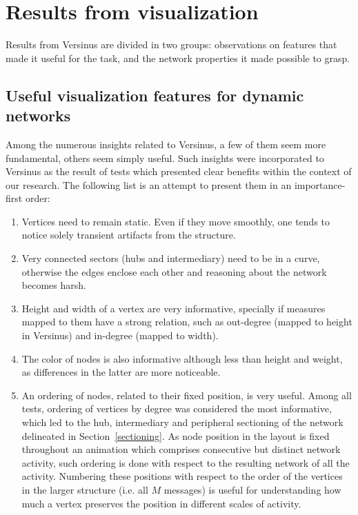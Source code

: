 \section{Results from visualization}
Results from Versinus are divided in two groups:
observations on features that made it useful for the task,
and the network properties it made possible to grasp.

\subsection{Useful visualization features for dynamic networks}

Among the numerous insights related to Versinus, a few of them seem more fundamental, others seem simply useful.
Such insights were incorporated to Versinus as the result of tests which presented clear benefits within the context of our research.
The following list is an attempt to present them in an importance-first order:
\begin{enumerate}
	\item Vertices need to remain static.
		Even if they move smoothly, one tends to notice solely transient artifacts from the structure.
	\item Very connected sectors (hubs and intermediary) need to be in a curve, otherwise the edges enclose each other and reasoning about the network becomes harsh.
	\item Height and width of a vertex are very informative, specially if measures mapped to them have a strong relation, such as out-degree (mapped to height in Versinus) and in-degree (mapped to width).
	\item The color of nodes is also informative although less than height and weight, as differences in the latter are more noticeable.
	\item An ordering of nodes, related to their fixed position, is very useful. Among all tests, ordering of vertices by degree was considered the most informative, which led to the hub, intermediary and peripheral sectioning of the network delineated in Section~\ref{sectioning}.
		As node position in the layout is fixed throughout an animation which comprises consecutive but distinct network activity, such ordering is done with respect to the resulting network of all the activity.
	Numbering these positions with respect to the order of the vertices in the larger structure (i.e. all $M$ messages) is useful for understanding how much a vertex preserves the position in different scales of activity.
\end{enumerate}

